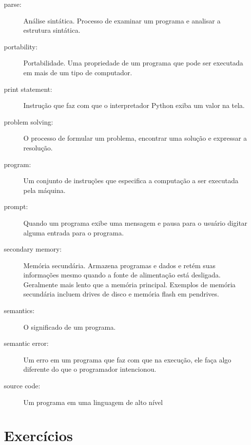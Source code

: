 \begin{description}
\item[parse:]  Análise sintática. Processo de examinar um programa e analisar a estrutura sintática.

\item[portability:]  Portabilidade. Uma propriedade de um programa que pode ser executada em mais de um tipo de computador.

\item[print statement:]  Instrução que faz com que o interpretador Python exiba um valor na tela.

\item[problem solving:]  O processo de formular um problema, encontrar uma solução e expressar a resolução.

\item[program:]  Um conjunto de instruções que especifica a computação a ser executada pela máquina.

\item[prompt:]  Quando um programa exibe uma mensagem e pausa para o usuário digitar alguma entrada para o programa.

\item[secondary memory:]  Memória secundária. Armazena programas e dados e retém suas informações mesmo quando a fonte de alimentação está desligada. Geralmente mais lento que a memória principal. Exemplos de memória secundária incluem drives de disco e memória flash em pendrives.

\item[semantics:]  O significado de um programa.

\item[semantic error:]  Um erro em um programa que faz com que na execução, ele faça algo diferente do que o programador intencionou.

\item[source code:]  Um programa em uma linguagem de alto nível

\end{description}

\section{Exercícios}


